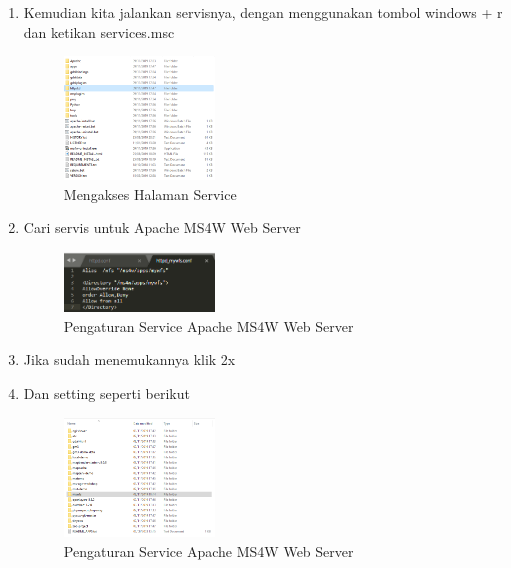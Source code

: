 \begin{enumerate}
  \item Kemudian kita jalankan servisnya, dengan menggunakan tombol windows + r dan ketikan services.msc
  \hfill\break
    \begin{figure}[H]
		\includegraphics[width=4cm]{figures/1174005/4/07.png}
		\centering
		\caption{Mengakses Halaman Service}
    \end{figure}

  \item Cari servis untuk Apache MS4W Web Server
    \begin{figure}[H]
		\includegraphics[width=4cm]{figures/1174005/4/08.png}
		\centering
		\caption{Pengaturan Service Apache MS4W Web Server}
    \end{figure}

  \item Jika sudah menemukannya klik 2x
  \item Dan setting seperti berikut
  \hfill\break
    \begin{figure}[H]
		\includegraphics[width=4cm]{figures/1174005/4/09.png}
		\centering
		\caption{Pengaturan Service Apache MS4W Web Server}
    \end{figure}

\end{enumerate}



